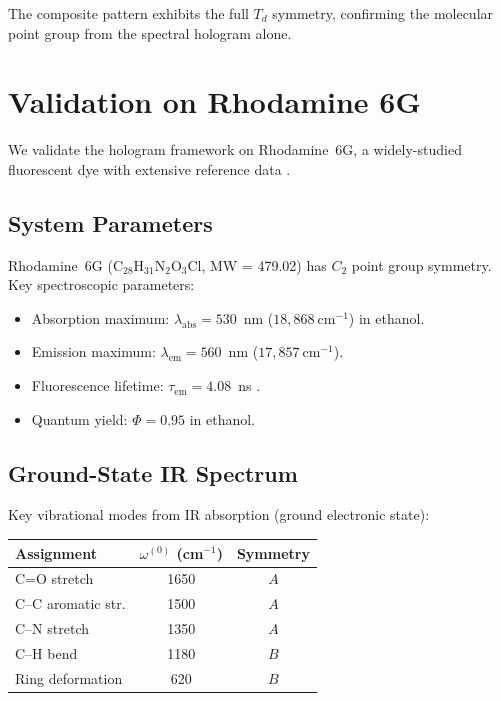 \documentclass[11pt,a4paper]{article}
\theoremstyle{definition}
\theoremstyle{remark}
\begin{document}
The composite pattern exhibits the full $T_d$ symmetry, confirming the molecular point group from the spectral hologram alone.

\section{Validation on Rhodamine 6G}
\label{sec:rhodamine}

We validate the hologram framework on Rhodamine~6G, a widely-studied fluorescent dye with extensive reference data \citep{kubin1982, magde1999}.

\subsection{System Parameters}

Rhodamine~6G (C$_{28}$H$_{31}$N$_2$O$_3$Cl, MW = 479.02) has $C_2$ point group symmetry. Key spectroscopic parameters:
\begin{itemize}
  \item Absorption maximum: $\lambda_{\mathrm{abs}} = 530$~nm ($18{,}868~\mathrm{cm}^{-1}$) in ethanol.
  \item Emission maximum: $\lambda_{\mathrm{em}} = 560$~nm ($17{,}857~\mathrm{cm}^{-1}$).
  \item Fluorescence lifetime: $\tau_{\mathrm{em}} = 4.08$~ns \citep{magde1999}.
  \item Quantum yield: $\Phi = 0.95$ in ethanol.
\end{itemize}

\subsection{Ground-State IR Spectrum}

Key vibrational modes from IR absorption (ground electronic state):
\begin{center}
\begin{tabular}{lcc}
\toprule
Assignment & $\omega^{(0)}$ (cm$^{-1}$) & Symmetry \\
\midrule
C=O stretch       & 1650 & $A$ \\
C--C aromatic str. & 1500 & $A$ \\
C--N stretch       & 1350 & $A$ \\
C--H bend          & 1180 & $B$ \\
Ring deformation   & 620  & $B$ \\
\bottomrule
\end{tabular}
\end{center}
\end{document}
